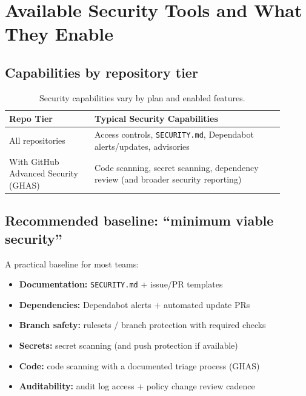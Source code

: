 \documentclass[11pt]{article}
\newcommand{\ghas}{\textsf{GitHub Advanced Security (GHAS)}}
\begin{document}
\section{Available Security Tools and What They Enable}

\subsection{Capabilities by repository tier}
\begin{table}[h!]
\centering
\begin{tabular}{@{}p{0.28\linewidth}p{0.62\linewidth}@{}}
\toprule
\textbf{Repo Tier} & \textbf{Typical Security Capabilities} \\
\midrule
All repositories & Access controls, \texttt{SECURITY.md}, Dependabot alerts/updates, advisories \\
With \ghas & Code scanning, secret scanning, dependency review (and broader security reporting) \\
\bottomrule
\end{tabular}
\caption{Security capabilities vary by plan and enabled features.}
\end{table}

\subsection{Recommended baseline: ``minimum viable security''}
A practical baseline for most teams:

\begin{checklistbox}
\begin{itemize}[leftmargin=*,itemsep=2pt]
  \item \textbf{Documentation:} \texttt{SECURITY.md} + issue/PR templates
  \item \textbf{Dependencies:} Dependabot alerts + automated update PRs
  \item \textbf{Branch safety:} rulesets / branch protection with required checks
  \item \textbf{Secrets:} secret scanning (and push protection if available)
  \item \textbf{Code:} code scanning with a documented triage process (GHAS)
  \item \textbf{Auditability:} audit log access + policy change review cadence
\end{itemize}
\end{checklistbox}
\end{document}
